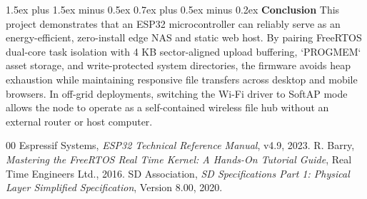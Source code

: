 \documentclass[conference]{IEEEtran}
\makeatletter
\renewcommand\section{\@startsection{section}{1}{\z@}%
  {1.5ex plus 1.5ex minus 0.5ex}%
  {0.7ex plus 0.5ex minus 0.2ex}%
  {\normalfont\normalsize\bfseries\centering}}
\makeatother
\begin{document}
\section{\textbf{Conclusion}}
This project demonstrates that an ESP32 microcontroller can reliably serve as an energy-efficient, zero-install edge NAS and static web host. By pairing FreeRTOS dual-core task isolation with 4 KB sector-aligned upload buffering, `PROGMEM` asset storage, and write-protected system directories, the firmware avoids heap exhaustion while maintaining responsive file transfers across desktop and mobile browsers. In off-grid deployments, switching the Wi-Fi driver to SoftAP mode allows the node to operate as a self-contained wireless file hub without an external router or host computer.

\begin{thebibliography}{00}
 Espressif Systems, \textit{ESP32 Technical Reference Manual}, v4.9, 2023.
 R. Barry, \textit{Mastering the FreeRTOS Real Time Kernel: A Hands-On Tutorial Guide}, Real Time Engineers Ltd., 2016.
 SD Association, \textit{SD Specifications Part 1: Physical Layer Simplified Specification}, Version 8.00, 2020.
\end{thebibliography}
\end{document}
